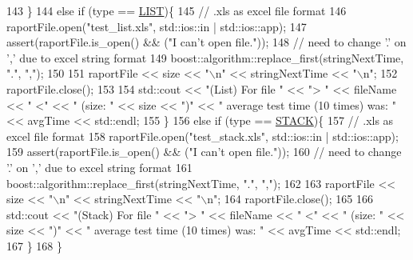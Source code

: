 \begin{DoxyCode}
143     \}
144     \textcolor{keywordflow}{else} \textcolor{keywordflow}{if} (type == \hyperlink{benchmark__frm_8h_ac2ad7f431e3446fddcd9b6b9f93c4c14a25688e799536738ea469158ef15fd1c0}{LIST})\{
145         \textcolor{comment}{// .xls as excel file format}
146         raportFile.open(\textcolor{stringliteral}{"test\_list.xls"}, std::ios::in | std::ios::app);
147             assert(raportFile.is\_open() && (\textcolor{stringliteral}{"I can't open file."}));
148         \textcolor{comment}{// need to change '.' on ',' due to excel string format }
149         boost::algorithm::replace\_first(stringNextTime, \textcolor{stringliteral}{"."}, \textcolor{stringliteral}{","});
150 
151         raportFile << size << \textcolor{stringliteral}{"\(\backslash\)n"} << stringNextTime << \textcolor{stringliteral}{"\(\backslash\)n"};
152         raportFile.close();
153 
154         std::cout << \textcolor{stringliteral}{"(List) For file "} << \textcolor{stringliteral}{"> "} << fileName << \textcolor{stringliteral}{" <"} << \textcolor{stringliteral}{" (size: "} << size << \textcolor{stringliteral}{")"} << \textcolor{stringliteral}{"
       average test time (10 times) was: "} << avgTime << std::endl;
155     \}
156     \textcolor{keywordflow}{else} \textcolor{keywordflow}{if} (type == \hyperlink{benchmark__frm_8h_ac2ad7f431e3446fddcd9b6b9f93c4c14a3bfeb3e4822bcc96abf42601a42bbcd3}{STACK})\{
157         \textcolor{comment}{// .xls as excel file format}
158         raportFile.open(\textcolor{stringliteral}{"test\_stack.xls"}, std::ios::in | std::ios::app);
159         assert(raportFile.is\_open() && (\textcolor{stringliteral}{"I can't open file."}));
160         \textcolor{comment}{// need to change '.' on ',' due to excel string format }
161         boost::algorithm::replace\_first(stringNextTime, \textcolor{stringliteral}{"."}, \textcolor{stringliteral}{","});
162 
163         raportFile << size << \textcolor{stringliteral}{"\(\backslash\)n"} << stringNextTime << \textcolor{stringliteral}{"\(\backslash\)n"};
164         raportFile.close();
165 
166         std::cout << \textcolor{stringliteral}{"(Stack) For file "} << \textcolor{stringliteral}{"> "} << fileName << \textcolor{stringliteral}{" <"} << \textcolor{stringliteral}{" (size: "} << size << \textcolor{stringliteral}{")"} << \textcolor{stringliteral}{"
       average test time (10 times) was: "} << avgTime << std::endl;
167     \}
168 \}
\end{DoxyCode}
\hypertarget{class_benchmark_a3efa1ec3d4e76eb0fa1633dda265c711}{}
